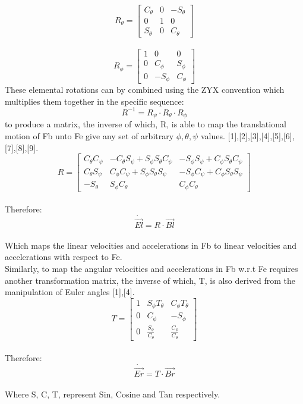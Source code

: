 \documentclass[12pt,a4paper,twoside]{report}
\begin{document}
			\\
			\begin{equation}
			R_\theta = 
			\begin{bmatrix}
				C_\theta & 0 & -S_\theta \\
				0 & 1 & 0 \\
				S_\theta & 0 & C_\theta
			\end{bmatrix}
			\end{equation}
			\\
			\begin{equation}
			R_\phi = 
			\begin{bmatrix}
				1 & 0 & 0 \\
				0 & C_\phi & S_\phi  \\
				0 & -S_\phi & C_\phi
			\end{bmatrix}
			\end{equation}
			\space
			These elemental rotations can by combined using the ZYX convention which multiplies them together in the specific sequence:
			\[R^{-1} = R_\psi \cdot R_\theta \cdot R_\phi\]
			to produce a matrix, the inverse of which, R, is able to map the translational motion of Fb unto Fe give any set of arbitrary \(\phi, \theta, \psi\) values. [1],[2],[3],[4],[5],[6],[7],[8],[9].
			\\
			\begin{equation}
			R = 
			\begin{bmatrix}
				C_\theta C_\psi & -C_\theta S_\psi + S_\phi S_\theta C_\psi & -S_\phi S_\psi + C_\phi S_\theta C_\psi \\
				C_\theta S_\psi &  C_\phi C_\psi + S_\phi S_\theta S_\psi   & -S_\phi C_\psi + C_\phi S_\theta S_\psi \\
				-S_\theta       &  S_\phi C_\theta                          &  C_\phi C_\theta
			\end{bmatrix}
			\end{equation}
			\\
			Therefore: 
			\[ \dot{\vec{El}} = R \cdot \vec{Bl} \]
			\\
			Which maps the linear velocities and accelerations in Fb to linear velocities and accelerations with respect to Fe.
			\\
			Similarly, to map the angular velocities and accelerations in Fb w.r.t Fe requires another transformation matrix, the inverse of which, T, is also derived from the manipulation of Euler angles [1],[4]. 
			\\
			\begin{equation}
			T = 
			\begin{bmatrix}
				1 & S_\phi T_\theta & C_\phi T_\theta \\
				0 & C_\phi & -S_\phi\\
				0 & \frac{S_\phi}{C_\theta}  & \frac{C_\phi}{C_\theta}
			\end{bmatrix}
			\end{equation} 
			\\
			Therefore:
			\\
			\[\dot{\vec{Er}} = T \cdot \vec{Br} \]
			\\
			Where S, C, T, represent Sin, Cosine and Tan respectively.
				
\end{document}
